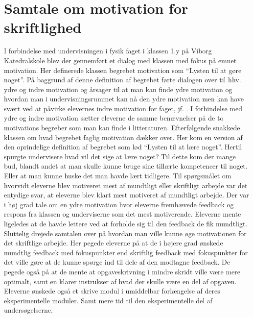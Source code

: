 \section{Samtale om motivation for skriftlighed}
\label{sec:sam}
I forbindelse med undervisningen i fysik faget i klassen 1.y på Viborg Katedralskole blev der gennemført et dialog med klassen med fokus på emnet motivation. Her definerede klassen begrebet motivation som ``Lysten til at gøre noget''. På baggrund af denne definition af begrebet førte dialogen over til hhv. ydre og indre motivation og årsager til at man kan finde ydre motivation og hvordan man i undervisningsrummet kan nå den ydre motivation men kan have svært ved at påvirke elevernes indre motivation for faget, jf. \citep{Buhl2010}. I forbindelse med ydre og indre motivation sætter eleverne de samme benævnelser på de to motivations begreber som man kan finde i litteraturen. Efterfølgende snakkede klassen om hvad begrebet faglig motivation dækker over. Her kom en version af den oprindelige definition af begrebet som lød ``Lysten til at lære noget''. Hertil spurgte undervisere hvad vil det sige at lære noget? Til dette kom der mange bud, blandt andet at man skulle kunne bruge sine tillærte kompetencer til noget. Eller at man kunne huske det man havde lært tidligere. Til spørgsmålet om hvorvidt eleverne blev motiveret mest af mundtligt eller skriftligt arbejde var det entydige svar, at eleverne blev klart mest motiveret af mundtligt arbejde. Der var i høj grad tale om en ydre motivation hvor eleverne fremhævede feedback og respons fra klassen og underviserne som det mest motiverende. Eleverne mente ligeledes at de havde lettere ved at forholde sig til den feedback de fik mundtligt. Sluttelig drejede samtalen over på hvordan man ville kunne øge motivationen for det skriftlige arbejde. Her pegede eleverne på at de i højere grad ønskede mundtlig feedback med fokuspunkter end skriftlig feedback med fokuspunkter for det ville gøre at de kunne spørge ind til dele af den modtagne feedback. De pegede også på at de mente at opgaveskrivning i mindre skridt ville være mere optimalt, samt en klarer instrukser af hvad der skulle være en del af opgaven. Eleverne ønskede også et skrive modul i umiddelbar forlængelse af deres eksperimentelle moduler. Samt mere tid til den eksperimentelle del af undersøgelserne.

